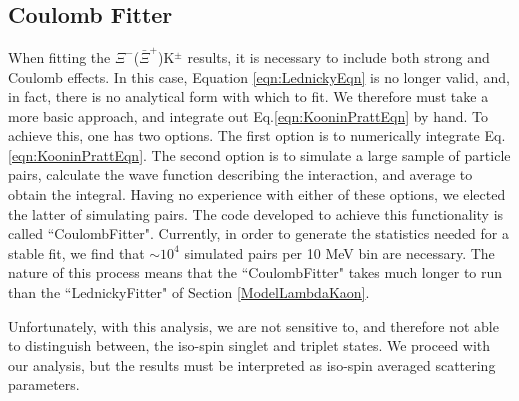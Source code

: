 \documentclass[../AnalysisNoteJBuxton.tex]{subfiles}
\begin{document}
\subsection{Coulomb Fitter}
\label{CoulombFitter}

When fitting the $\Xi^{-}$($\bar{\Xi}^{+}$)K$^{\pm}$ results, it is necessary to include both strong and Coulomb effects.
In this case, Equation \ref{eqn:LednickyEqn} is no longer valid, and, in fact, there is no analytical form with which to fit.
We therefore must take a more basic approach, and integrate out Eq.\ref{eqn:KooninPrattEqn} by hand.
To achieve this, one has two options.  The first option is to numerically integrate Eq.\ref{eqn:KooninPrattEqn}.  The second option is to simulate a large sample of particle pairs, calculate the  wave function describing the interaction, and average to obtain the integral.  Having no experience with either of these options, we elected the latter of simulating pairs.
The code developed to achieve this functionality is called ``CoulombFitter".
Currently, in order to generate the statistics needed for a stable fit, we find that $\sim 10^{4}$ simulated pairs per 10 MeV bin are necessary.
The nature of this process means that the ``CoulombFitter" takes much longer to run than the ``LednickyFitter" of Section \ref{ModelLambdaKaon}.


Unfortunately, with this analysis, we are not sensitive to, and therefore not able to distinguish between, the iso-spin singlet and triplet states.  We proceed with our analysis, but the results must be interpreted as iso-spin averaged scattering parameters.

\begin{comment}
\begin{equation}
\begin{array}{l}
\vspace{2mm}
  C(\mathbf{k^{*}}) = \sum\limits_{S}\rho_{S}\int S(\mathbf{r^{*}})|\Psi^{S}_{\mathbf{k^{*}}}(\mathbf{r^{*}})|^{2}d^{3}\mathbf{r^{*}} \\
\vspace{3mm}
  ~~~~~\Psi_{\mathbf{k^{*}}}(\mathbf{r^{*}}) = e^{i\delta_{c}}\sqrt{A_{c}(\eta)}[e^{i\mathbf{k^{*}} \cdot \mathbf{r^{*}}}F(-i\eta,1,i\xi) + f_{c}(k^{*})\frac{\tilde{G}(\rho,\eta)}{r^{*}}] \\
\vspace{3mm}
  ~~~~~f_{c}(k^{*}) = [\frac{1}{f_{0}} + \frac{1}{2}d_{0}k^{*2} - \frac{2}{a_{c}}h(\eta) - ik^{*}A_{c}(\eta)]^{-1} \\
\vspace{3mm}
  ~~~~~\rho = k^{*}r^{*};~ \eta = (k^{*}a)^{-1};~ a_{c} = (\mu z_{1}z_{2}e^{2})^{-1} \\  
\vspace{2mm}
  ~~~~~\xi = \mathbf{k^{*}} \cdot \mathbf{r^{*}} + k^{*}r^{*} \equiv \rho(1+\cos\theta^{*}) \\
\end{array}
\label{eqn:CoulombEqn}
\end{equation}
\end{comment}
\end{document}
